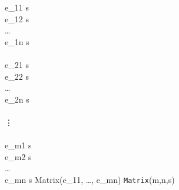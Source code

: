 
      {\Gamma \vdash e_{11} \Rightarrow s \\ \Gamma \vdash e_{12} \Rightarrow s \\ \ldots{} \\ \Gamma \vdash e_{1n} \Rightarrow s \\\\%
       \Gamma \vdash e_{21} \Rightarrow s \\ \Gamma \vdash e_{22} \Rightarrow s \\ \ldots{} \\ \Gamma \vdash e_{2n} \Rightarrow s \\\\%
       \vdots{}\\\\%
       \Gamma \vdash e_{m1} \Rightarrow s \\ \Gamma \vdash e_{m2} \Rightarrow s \\ \ldots{} \\ \Gamma \vdash e_{mn} \Rightarrow s}
      {Matrix(e_{11}, \ldots{}, e_{mn}) \Rightarrow \texttt{Matrix}(m,n,s)}


